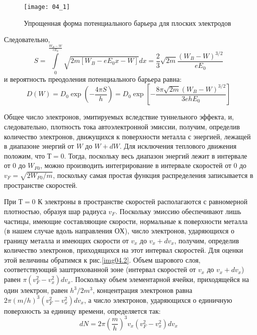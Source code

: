 \begin{figure}[h]
    \center
    \texttt{[image: 04\_1]}
    \caption{Упрощенная форма потенциального барьера для плоских электродов}
    \label{img04.1}
\end{figure}
 
Следовательно,
\[
	S = \int\limits_{0}^{\frac{W_B - W}{eE_0}} \sqrt{2m[W_B-eE_0 x - W]}dx = 
		\frac{2}{3}\sqrt{2m}\frac{(W_B-W)^{3/2}}{eE_0}
\]
и вероятность преодоления потенциального барьера равна:
\begin{equation}
	D(W) = D_0 \exp\left( -\frac{4\pi S}{h} \right) = 
		D_0 \exp\left[ -\frac{8\pi\sqrt{2m}(W_B-W)^{3/2}}{3ehE_0} \right]
	\label{eq04.1.13}
\end{equation}

Общее число электронов, эмитируемых вследствие туннельного эффекта, и, 
следовательно, плотность тока автоэлектронной эмиссии, получим, определив 
количество электронов, движущихся к поверхности металла с энергией, лежащей в 
диапазоне энергий от \( W \) до \( W + dW \). Для исключения теплового 
движения положим, что \( Т = 0 \). Тогда, поскольку весь диапазон энергий 
лежит в интервале от \( 0 \) до \( W_{F0} \), можно производить интегрирование 
в интервале скоростей от \( 0 \) до \( v_F = \sqrt{2W_{F0}/m} \), поскольку 
самая простая функция распределения записывается в пространстве скоростей.

При \( Т = 0 \) К электроны в пространстве скоростей располагаются с 
равномерной плотностью, образуя шар радиуса \( v_F \). Поскольку эмиссию 
обеспечивают лишь частицы, имеющие составляющие скорости, нормальные к 
поверхности металла (в нашем случае вдоль направления \(ОХ\)), число 
электронов, ударяющихся о границу металла и имеющих скорости от \( v_x \) до 
\( v_x + dv_x \), получим, определив количество электронов, приходящихся на 
этот интервал скоростей. Для оценки этой величины обратимся к 
рис.\ref{img04.2}. Объем шарового слоя, соответствующий заштрихованной зоне 
(интервал скоростей от \( v_x \) до \( v_x + dv_x\)) равен 
\( \pi(v^2_F - v^2_x)dv_x \). Поскольку объем элементарной ячейки, 
приходящейся на один электрон, равен \( h^3 / 2m^3 \), концентрация электронов 
равна \( 2\pi(m/h)^3 (v^2_F - v^2_x)dv_x \), а число электронов, ударяющихся о 
единичную поверхность за единицу времени, определяется так:
\begin{equation}
	dN = 2\pi\left( \frac{m}{h} \right)^3 v_x \left( v^2_F - v^2_x \right)dv_x
	\label{eq04.1.14}
\end{equation}

